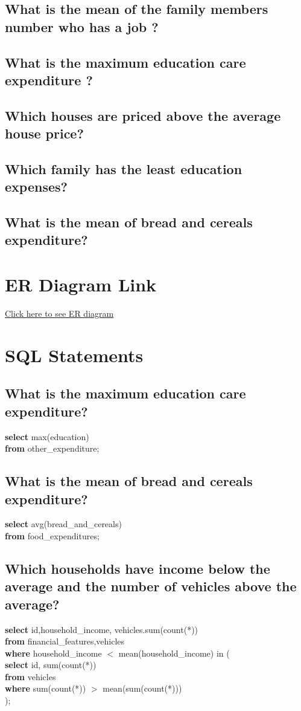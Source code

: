 \documentclass[12 pt]{article}
\begin{document}
\begin{large}
\begin{large}
\subsection{What is the mean of the family members number who has a job ?}
\subsection{What is the maximum education care expenditure ?}
\subsection{Which houses are priced above the average house price?}
\subsection{Which family has the least education expenses?}
\subsection{What is the mean of bread and cereals expenditure?}
\bigbreak
\bigbreak
\bigbreak
\section{ER Diagram Link}
\bigbreak \href{https://github.com/mehmetresitcagan/Database-Project-Phase-I}{Click here to see ER diagram}
\newpage
\section{SQL Statements}
\subsection{What is the maximum education care expenditure?}\bigbreak
\noindent\textbf{select} max(education)\\
	\textbf{from} other\_expenditure;\\
\subsection{What is the mean of bread and cereals expenditure?}\bigbreak
\noindent\textbf{select} avg(bread\_and\_cereals)\\
	               \textbf{from} food\_expenditures;\\
 \subsection{Which households have income below the average and the number of vehicles above the average?}\bigbreak
 \noindent\textbf{select} id,household\_income, vehicles.sum(count(*))\\
\textbf{from} financial\_features,vehicles\\
\textbf{where }household\_income $<$ mean(household\_income) in (\\
\textbf{select} id, sum(count(*))\\
\textbf{from} vehicles\\
\textbf{where} sum(count(*)) $>$ mean(sum(count(*)))\\
);\\
\newpage

\end{large}
\end{large}
\end{document}
